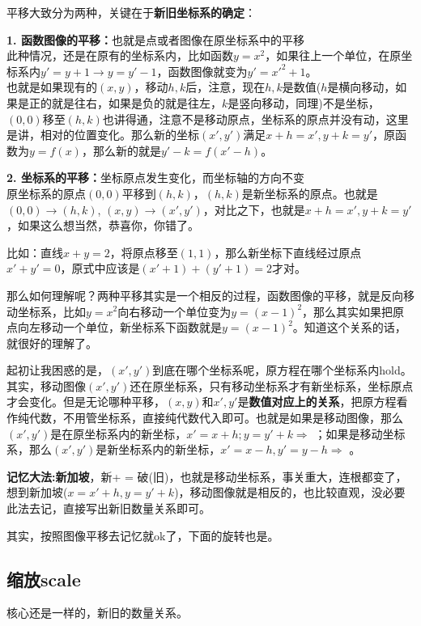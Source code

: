 \documentclass[../main.tex]{subfiles}
\begin{document}
平移大致分为两种，关键在于\textbf{新旧坐标系的确定}：

\textbf{1. 函数图像的平移：}也就是点或者图像在原坐标系中的平移\\
此种情况，还是在原有的坐标系内，比如函数$y=x^2$，如果往上一个单位，在原坐标系内$y'=y+1 \rightarrow y=y'-1$，函数图像就变为$y'=x'^2+1$。\\
也就是如果现有的$(x,y)$，移动$h,k$后，注意，现在$h,k$是数值($h$是横向移动，如果是正的就是往右，如果是负的就是往左，$k$是竖向移动，同理)不是坐标，$(0,0)$移至$(h,k)$也讲得通，注意不是移动原点，坐标系的原点并没有动，这里是讲，相对的位置变化。那么新的坐标$(x', y')$满足$x+h=x', y+k=y'$，原函数为$y=f(x)$，那么新的就是$y'-k=f(x'-h)$。

\textbf{2. 坐标系的平移：}坐标原点发生变化，而坐标轴的方向不变\\
原坐标系的原点$(0,0)$平移到$(h, k)$，$(h,k)$是新坐标系的原点。也就是\\
$(0,0) \rightarrow (h,k)$, $(x,y) \rightarrow (x', y')$，对比之下，也就是$x+h=x', y+k=y'$，如果这么想当然，恭喜你，你错了。

比如：直线$x+y=2$，将原点移至$(1,1)$，那么新坐标下直线经过原点$x'+y'=0$，原式中应该是$(x'+1)+(y'+1)=2$才对。

那么如何理解呢？两种平移其实是一个相反的过程，函数图像的平移，就是反向移动坐标系，比如$y=x^2$向右移动一个单位变为$y=(x-1)^2$，那么其实如果把原点向左移动一个单位，新坐标系下函数就是$y=(x-1)^2$。知道这个关系的话，就很好的理解了。

起初让我困惑的是，$(x',y')$到底在哪个坐标系呢，原方程在哪个坐标系内hold。其实，移动图像$(x',y')$还在原坐标系，只有移动坐标系才有新坐标系，坐标原点才会变化。但是无论哪种平移，$(x,y)$和$x',y'$是\textbf{数值对应上的关系}，把原方程看作纯代数，不用管坐标系，直接纯代数代入即可。也就是如果是移动图像，那么$(x',y')$是在原坐标系内的新坐标，$x'=x+h; y=y'+k \Rightarrow $ ；如果是移动坐标系，那么$(x',y')$是新坐标系内的新坐标，$x'=x-h, y'=y-h \Rightarrow $ 。

\textbf{记忆大法:新加坡}，新+ = 破(旧)，也就是移动坐标系，事关重大，连根都变了，想到新加坡($x=x'+h, y=y'+k$)，移动图像就是相反的，也比较直观，没必要此法去记，直接写出新旧数量关系即可。

其实，按照图像平移去记忆就ok了，下面的旋转也是。

\subsection{缩放scale}
核心还是一样的，新旧的数量关系。
\end{document}
